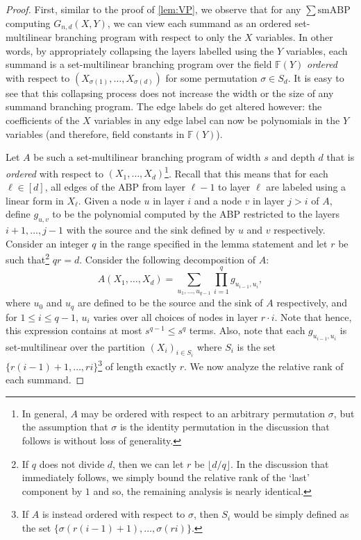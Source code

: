 \documentclass[10pt,a4paper]{article}
\theoremstyle{definition}%
\theoremstyle{plain}
\newcommand{\sbp}{\sum\mathrm{smABP}}
\newcommand{\F}{\mathbb F}
\begin{document}
\begin{proof}
First, similar to the proof of \autoref{lem:VP}, we observe that for any $\sbp$ computing $G_{n,d}(X,Y)$, we can view each summand as an ordered set-multilinear branching program with respect to only the $X$ variables. In other words, by appropriately collapsing the layers labelled using the $Y$ variables, each summand is a set-multilinear branching program over the field $\F(Y)$ \emph{ordered} with respect to $(X_{\sigma(1)},\ldots, X_{\sigma(d)})$ for some permutation $\sigma\in S_d$. It is easy to see that this collapsing process does not  increase the width or the size of any summand branching program.  The edge labels do get altered however: the coefficients of the $X$ variables in any edge label can now be polynomials in the $Y$ variables (and therefore, field constants in $\F(Y)$).


Let $A$ be such a set-multilinear branching program of width $s$ and depth $d$ that is \emph{ordered} with respect to $(X_1,\ldots, X_d)$\footnote{In general, $A$ may be ordered with respect to an arbitrary permutation $\sigma$, but the assumption that $\sigma$ is the identity permutation in the discussion that follows is without loss of generality.}. Recall that this means that for each $\ell\in[d]$, all edges of the ABP from layer $\ell-1$ to layer $\ell$ are labeled using a linear form {in} $\mathit{X_\ell}$. Given a node $u$ in layer $i$ and a node $v$ in layer $j>i$ of $A$, define $g_{u,v}$ to be the polynomial computed by the ABP restricted to the layers $i+1,\ldots,j-1$ with the source and the sink defined by $u$ and $v$ respectively. Consider an integer $q$ in the range specified in the lemma statement and let $r$ be such that\footnote{\label{foot:rdq} If $q$ does not divide $d$, then we can let $r$ be $\lfloor d/q\rfloor$. In the discussion that immediately follows, we simply bound the relative rank of the `last' component by $1$ and so, the remaining analysis is nearly identical.} $qr = d$. Consider the following decomposition of $A$:
\[
A(X_1,\ldots,X_d) = \sum_{u_1,\ldots, u_{q-1}} \prod_{i = 1}^{q} g_{u_{i-1},u_i},
\]
where $u_0$ and $u_{q}$ are defined to be the source and the sink of $A$ respectively, and for $1\leq i \leq q-1$, $u_i$ varies over all choices of nodes in layer $r\cdot i$. Note that hence, this expression contains at most $s^{q-1}\leq s^q$ terms. Also, note that each $g_{u_{i-1},u_i}$ is set-multilinear over the partition $(X_i)_{i\in S_i}$ where $S_i$ is the set $\{r(i-1) + 1, \ldots, ri\}$\footnote{If $A$ is instead  ordered with respect to $\sigma$, then $S_i$ would be simply defined as the set $\{\sigma(r(i-1) + 1), \ldots, \sigma(ri)\}$.} of length exactly $r$. We now analyze the relative rank of each summand. 


\end{proof}
\end{document}
